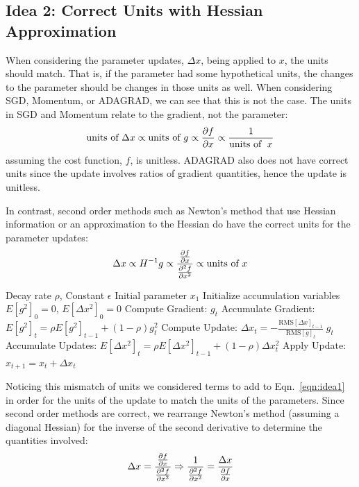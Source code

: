 \documentclass{article}
\def\BE{\vspace{-2.0mm}\begin{equation}}
\def\EE{\vspace{-1.4mm}\end{equation}}
\def\BEA{\vspace{-2.0mm}\begin{eqnarray}}
\def\EEA{\vspace{-1.0mm}\end{eqnarray}}
\newcommand{\eqn}[1]{Eqn.~\ref{eqn:#1}}
\def\units{{\text{units of }}}
\begin{document}
\subsection{Idea 2: Correct Units with Hessian Approximation}
When considering the parameter updates, $\Delta x$, being applied to $x$, the units should
match. That is, if the parameter had some hypothetical units, the changes to the parameter should
be changes in those units as well.
When considering SGD, Momentum, or ADAGRAD, we can see that this is not the case.
The units in SGD and Momentum relate to the gradient, not the parameter:
\BE
\units \Delta x \propto \units g \propto \frac{\partial f}{\partial x} \propto \frac{1}{\units \; x}
\EE
assuming the cost function, $f$, is unitless. ADAGRAD also does not have correct units since the
update involves ratios of gradient quantities, hence the update is unitless.

In contrast, second order methods such as Newton's method that use Hessian information or an
approximation to the Hessian do have the correct units for the parameter updates:
\BEA
\Delta x \propto H^{-1} g \propto
\frac{\frac{\partial f}{\partial x}}{\frac{\partial^2 f}{\partial x^2}}
\propto \units x
\EEA

\begin{algorithm}[t!]
\small
\begin{algorithmic}[1]
\REQUIRE Decay rate $\rho$,  Constant $\epsilon$
\REQUIRE Initial parameter $x_1$
\STATE Initialize accumulation variables $E[g^2]_0 = 0$, $E[\Delta x^2]_0 = 0$
\STATE Compute Gradient: $g_t$
\STATE Accumulate  Gradient: $E[g^2]_t = \rho E[g^2]_{t-1} + (1-\rho) g_t^2$
\STATE Compute Update: $\Delta x_t = - \frac{\text{RMS}[\Delta x]_{t-1}}{\text{RMS}[g]_t} \; g_t$
\STATE Accumulate Updates:  $E[\Delta x^2]_t = \rho E[\Delta x^2]_{t-1} + (1-\rho)
\Delta x_t^2$
\STATE Apply Update: $x_{t+1} = x_t + \Delta x_t$
\ENDFOR
\end{algorithmic}
\small
\caption{Computing ADADELTA update at time $t$}
\small
\label{alg:am}
\end{algorithm}


Noticing this mismatch of units we considered terms to add to \eqn{idea1} in order for the
units of the update to match the units of the parameters.
Since second order methods are correct, we rearrange Newton's method (assuming a diagonal Hessian) for the inverse
of the second derivative to determine the quantities involved:
\BEA
\Delta x = \frac{\frac{\partial f}{\partial x}}{\frac{\partial^2 f}{\partial x^2}}
\Rightarrow
\frac{1}{\frac{\partial^2 f}{\partial x^2}} =  \frac{\Delta x}{\frac{\partial f}{\partial x}}
\label{eqn:newton}
\EEA
\end{document}
